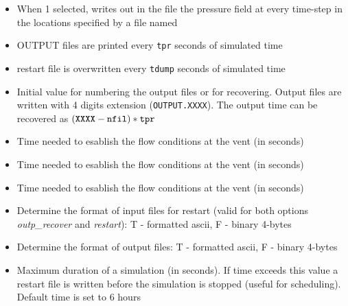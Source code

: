 \begin{itemize}
\item
{}
{ When 1 selected, writes out in the file  the pressure field at every time-step
in the locations specified by a file named }

\item
{}
{OUTPUT files are printed every {\tt tpr} seconds of simulated time}

\item
{}
{restart file is overwritten every {\tt tdump} seconds of simulated time}

\item
{}
{Initial value for numbering the output files or for recovering.
Output files are written with 4 digits extension ({\tt OUTPUT.XXXX}). 
The output time can be recovered as $({\tt XXXX - nfil})* {\tt tpr}$ }

\item
{}
{Time needed to esablish the flow conditions at the vent (in seconds)}

\item
{}
{Time needed to esablish the flow conditions at the vent (in seconds)}

\item
{}
{Time needed to esablish the flow conditions at the vent (in seconds)}

\item
{}
{Determine the format of input files for restart (valid for both options
{\em outp\_recover} and {\em restart}): T - formatted ascii, 
F - binary 4-bytes }

\item
{}
{Determine the format of output files: T - formatted ascii, 
F - binary 4-bytes }

\item
{}
{Maximum duration of a simulation (in seconds). If time exceeds this value
a restart file is written before the simulation is stopped (useful for
scheduling). Default time is set to 6 hours}
\end{itemize}

